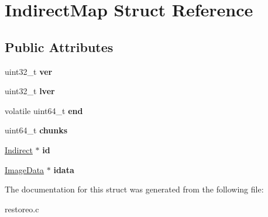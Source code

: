 \hypertarget{structIndirectMap}{\section{\-Indirect\-Map \-Struct \-Reference}
\label{structIndirectMap}
}
\subsection*{\-Public \-Attributes}
\begin{DoxyCompactItemize}
\item 
\hypertarget{structIndirectMap_abd7328d89ca36420d502a3baa43cbcdb}{uint32\-\_\-t {\bfseries ver}}\label{structIndirectMap_abd7328d89ca36420d502a3baa43cbcdb}

\item 
\hypertarget{structIndirectMap_a8581010799785962186bb97b341a22e0}{uint32\-\_\-t {\bfseries lver}}\label{structIndirectMap_a8581010799785962186bb97b341a22e0}

\item 
\hypertarget{structIndirectMap_a1c5bbee5568cae53ea4b25f70e926e4e}{volatile uint64\-\_\-t {\bfseries end}}\label{structIndirectMap_a1c5bbee5568cae53ea4b25f70e926e4e}

\item 
\hypertarget{structIndirectMap_aef52eba987d7dddd37248380dd3f5044}{uint64\-\_\-t {\bfseries chunks}}\label{structIndirectMap_aef52eba987d7dddd37248380dd3f5044}

\item 
\hypertarget{structIndirectMap_a0cef4931609b7d23c102db348f135ff9}{\hyperlink{structIndirect}{\-Indirect} $\ast$ {\bfseries id}}\label{structIndirectMap_a0cef4931609b7d23c102db348f135ff9}

\item 
\hypertarget{structIndirectMap_a15cc11e12055cce03679b74cbd8e95eb}{\hyperlink{structImageData}{\-Image\-Data} $\ast$ {\bfseries idata}}\label{structIndirectMap_a15cc11e12055cce03679b74cbd8e95eb}

\end{DoxyCompactItemize}


\-The documentation for this struct was generated from the following file\-:\begin{DoxyCompactItemize}
\item 
restoreo.\-c\end{DoxyCompactItemize}
